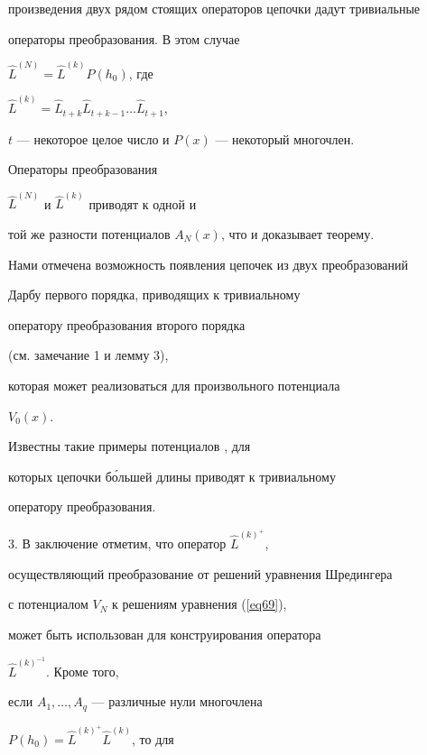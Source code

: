 произведения двух рядом стоящих операторов цепочки дадут тривиальные


операторы преобразования. В этом случае


$\widehat{L}^{(N)}=\widehat{L}^{(k)}P(h_0)$, где


$\widehat{L}^{(k)}=


\widehat{L}_{t+k}\widehat{L}_{t+k-1}\dotsc \widehat{L}_{t+1}$,


$t$ --- некоторое целое число и $ P(x)$ --- некоторый многочлен.


Операторы преобразования


$\widehat{L}^{(N)}$ и $\widehat{L}^{(k)}$ приводят к одной и


той же разности потенциалов $A_N(x)$, что и доказывает теорему.





\begin{note}


Нами отмечена возможность появления цепочек из двух преобразований


Дарбу первого порядка, приводящих к тривиальному


оператору преобразования второго порядка


(см. замечание 1 и лемму 3),


которая может реализоваться для произвольного потенциала


$V_0(x)$.


Известны такие примеры потенциалов \cite{L}, для


которых  цепочки б\'ольшей длины приводят к тривиальному


оператору преобразования.


\end{note}





3. В заключение отметим, что оператор $\widehat{L}^{(k)^{+}}$,


осуществляющий преобразование от решений уравнения Шредингера


с потенциалом $V_{N}$ к решениям уравнения (\ref{eq69}),


может быть использован для конструирования оператора


$\widehat{L}^{(k)^{-1}}$. Кроме того,


если $A_1,\dotsc ,A_q$ --- различные нули многочлена


$P(h_0)=\widehat{L}^{(k)^{+}}\widehat{L}^{(k)}$, то для


